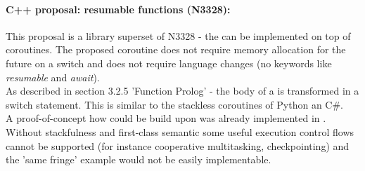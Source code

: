 \paragraph*{C++ proposal: resumable functions (N3328\cite{n3328}):}
This proposal is a library superset of N3328 - the \resumfn can be implemented
on top of coroutines. The proposed coroutine does not require memory allocation
for the future on a switch and does not require language changes (no keywords
like \textit{resumable} and \textit{await}).\\
As described in section 3.2.5 'Function Prolog' - the body of a \resumfn is
transformed in a switch statement. This is similar to the stackless coroutines
of Python an C\#.\\
A proof-of-concept how \await could be build upon \boostcoroutine was already
implemented in \awaitemu.\\
\newline
Without stackfulness and first-class semantic some useful execution control
flows cannot be supported (for instance cooperative multitasking,
checkpointing) and the 'same fringe' example would not be easily implementable.
